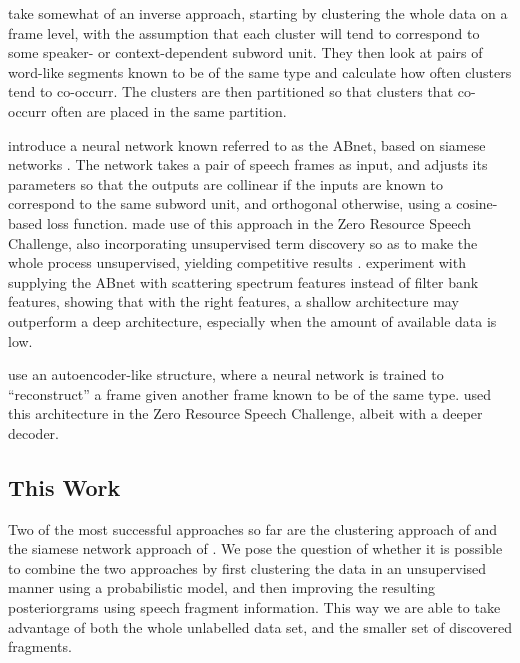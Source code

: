 \textcite{jansen2013weak} take somewhat of an inverse approach, starting by clustering the whole data on a frame level, with the assumption that each cluster will tend to correspond to some speaker- or context-dependent subword unit.
They then look at pairs of word-like segments known to be of the same type and calculate how often clusters tend to co-occurr.
The clusters are then partitioned so that clusters that co-occurr often are placed in the same partition.

\textcite{synnaeve2014phonetics} introduce a neural network known referred to as the ABnet, based on siamese networks \parencite{bromley1994signature}.
The network takes a pair of speech frames as input, and adjusts its parameters so that the outputs are collinear if the inputs are known to correspond to the same subword unit, and orthogonal otherwise, using a cosine-based loss function.
\textcite{thiolliere2015hybrid} made use of this approach in the Zero Resource Speech Challenge, also incorporating unsupervised term discovery so as to make the whole process unsupervised, yielding competitive results \parencite{versteegh2016zero}.
\textcite{zeghidour2016deep} experiment with supplying the ABnet with scattering spectrum features instead of filter bank features, showing that with the right features, a shallow architecture may outperform a deep architecture, especially when the amount of available data is low.

\textcite{kamper2015unsupervised} use an autoencoder-like structure, where a neural network is trained to ``reconstruct'' a frame given another frame known to be of the same type.
\textcite{renshaw2015comparison} used this architecture in the Zero Resource Speech Challenge, albeit with a deeper decoder.

\subsection{This Work}

Two of the most successful approaches so far are the clustering approach of \textcite{chen2015parallel} and the siamese network approach of \textcite{thiolliere2015hybrid}.
We pose the question of whether it is possible to combine the two approaches by first clustering the data in an unsupervised manner using a probabilistic model, and then improving the resulting posteriorgrams using speech fragment information.
This way we are able to take advantage of both the whole unlabelled data set, and the smaller set of discovered fragments.

